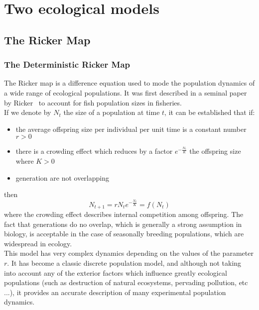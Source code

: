 \documentclass[12pt]{article}
\begin{document}
	\clearpage
	\section{Two ecological models}
	\subsection{The Ricker Map}  \label{rickerGen}
	\subsubsection{The Deterministic Ricker Map}
	The Ricker map is a difference equation used to mode the population dynamics of a wide range of ecological populations. It was first described in a seminal paper by Ricker~\cite{Ricker1954} to account for fish population sizes in fisheries. \\
	If we denote by $N_t$ the size of a population at time $t$, it can be established that if:
	\begin{itemize}
	\item the average offspring size per individual per unit time is a constant number $r > 0$
	\item there is a crowding effect which reduces by a factor $e^{-\frac{N_t}{K}}$ the offspring size where $K > 0$
	\item generation are not overlapping
	\end{itemize}
	then 
	\begin{equation} 
	N_{t+1} = r N_t e^{-\frac{N_t}{K}} = f(N_t)
	\label{eq:ricker}
	\end{equation}
	where the crowding effect describes internal competition among offspring.
	The fact that generations do no overlap, which is generally a strong assumption in biology, is acceptable in the case of seasonally breeding populations, which are widespread in ecology. \\
	This model has very complex dynamics depending on the values of the parameter $r$. It has become a classic discrete population model, and although not taking into account any of the exterior factors which influence greatly ecological populations (such as destruction of natural ecosystems, pervading pollution, etc ...), it provides an accurate description of many experimental population dynamics.
	
\end{document}
